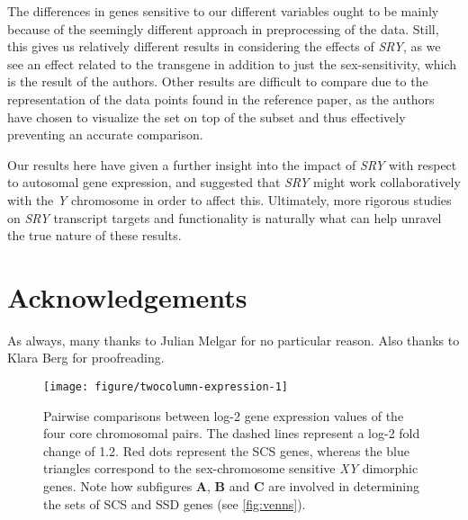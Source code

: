 \documentclass[10pt, twocolumn]{article}\usepackage[]{graphicx}\usepackage[]{color}
\makeatletter
\def\maxwidth{ %
  \ifdim\Gin@nat@width>\linewidth
    \linewidth
  \else
    \Gin@nat@width
  \fi
}
\theoremstyle{plain}
\newcommand{\SRY}{\textit{SRY}\xspace}
\newcommand{\Y}{\textit{Y}\xspace}
\makeatother
\begin{document}
The differences in genes sensitive to our different variables ought to be mainly because of the seemingly different approach in preprocessing of the data. Still, this gives us relatively different results in considering the effects of \SRY, as we see an effect related to the transgene in addition to just the sex-sensitivity, which is the result of the authors. Other results are difficult to compare due to the representation of the data points found in the reference paper, as the authors have chosen to visualize the set on top of the subset and thus effectively preventing an accurate comparison.

Our results here have given a further insight into the impact of \SRY with respect to autosomal gene expression, and suggested that \SRY might work collaboratively with the \Y chromosome in order to affect this. Ultimately, more rigorous studies on \SRY transcript targets and functionality is naturally what can help unravel the true nature of these results.

\section*{Acknowledgements}
As always, many thanks to Julian Melgar for no particular reason. Also thanks to Klara Berg for proofreading.

\printbibliography

\begin{Schunk}
\begin{figure*}[h]

{\centering \texttt{[image: figure/twocolumn-expression-1]} 

}

\caption{Pairwise comparisons between log-2 gene expression values of the four core chromosomal pairs. The dashed lines represent a log-2 fold change of 1.2. Red dots represent the SCS genes, whereas the blue triangles correspond to the sex-chromosome sensitive \textit{XY} dimorphic genes. Note how subfigures \textbf{A}, \textbf{B} and \textbf{C} are involved in determining the sets of SCS and SSD genes (see \cref{fig:venns}).}\label{fig:expression}
\end{figure*}
\end{Schunk}
\end{document}
